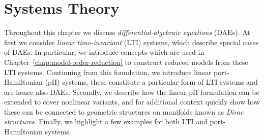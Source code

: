 \chapter{Systems Theory}\label{chap:systems-theory}

Throughout this chapter we discuss \emph{differential-algebraic equations} (DAEs).
At first we consider \emph{linear time-invariant} (LTI) systems, which describe special cases of DAEs.
In particular, we introduce concepts which are used in Chapter~\ref{chap:model-order-reduction} to construct reduced models from these LTI systems.
Continuing from this foundation, we introduce linear port-Hamiltonian (pH) systems, these constitute a particular form of LTI systems and are hence also DAEs.
Secondly, we describe how the linear pH formulation can be extended to cover nonlinear variants, and for additional context quickly show how these can be connected to geometric structures on manifolds known as \emph{Dirac structures}.
Finally, we highlight a few examples for both LTI and port-Hamiltonian systems.




